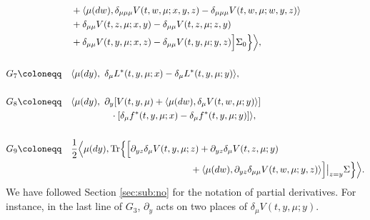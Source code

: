 \documentclass{amsart}
\theoremstyle{definition}
\theoremstyle{remark}
\numberwithin{equation}{section}
\begin{document}
{\begin{align*}
&+\langle\mu(dw),   \delta_{\mu\mu\mu}  V(t, w,\mu; x,y,z)- \delta_{\mu\mu\mu}  V(t, w,\mu; w,y,z) \rangle  \\
&+  \delta_{\mu\mu}  V(t, z,\mu; x,y)- \delta_{\mu\mu}  V(t, z,\mu; z,y)    \\
&+    \delta_{\mu\mu}  V(t, y,\mu; x,z)- \delta_{\mu\mu}  V(t, y,\mu; y,z)  \Big]\Sigma_0 \Big\}\Big\rangle, \\
 &\\
G_7 \coloneqq \quad  &  \langle \mu(dy) , \   \delta_\mu L^* (t,y,\mu; x) - \delta_\mu L^*(t,y,\mu; y) \rangle ,\nonumber  \\
&\\
G_8 \coloneqq \quad &  \langle \mu(dy) , \  \partial_y[ V(t,y,\mu)  +\langle \mu(dw), \delta_\mu V(t, w, \mu;y) \rangle ] \\
&\hskip 1.5cm \cdot    [\delta_\mu f^* (t,y,\mu; x) - \delta_\mu f^*(t,y,\mu; y)] \rangle ,\nonumber \\
&\\
G_9\coloneqq\quad  &   \frac{1}{2}\Big\langle \mu(dy),    \mbox{Tr} \Big\{\Big[\partial_{yz}\delta_\mu V(t, y, \mu; z) +\partial_{yz}\delta_\mu V(t, z, \mu; y) \\
& \hskip 4.5cm+\langle \mu(dw),  \partial_{yz}\delta_{\mu\mu} V (t,w,\mu;y,z) \rangle\Big]\big|_{z=y}\Sigma\Big\}  \Big\rangle.
\end{align*}
}
We have followed Section  \ref{sec:sub:no} for the notation of partial derivatives. For instance, in the last line of $G_3$, $\partial_y$ acts on two places of $\delta_\mu V(t,y,\mu;y)$.
\end{document}
